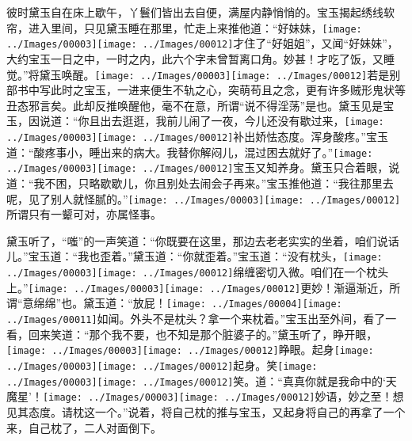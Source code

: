 彼时黛玉自在床上歇午，丫鬟们皆出去自便，满屋内静悄悄的。宝玉揭起绣线软帘，进入里间，只见黛玉睡在那里，忙走上来推他道：``好妹妹，{\texttt{[image: ../Images/00003]}\texttt{[image: ../Images/00012]}\footnotesize \kaishu 才住了``好姐姐''，又闻``好妹妹''，大约宝玉一日之中，一时之内，此六个字未曾暂离口角。妙甚！}才吃了饭，又睡觉。''将黛玉唤醒。{\texttt{[image: ../Images/00003]}\texttt{[image: ../Images/00012]}\footnotesize \kaishu 若是别部书中写此时之宝玉，一进来便生不轨之心，突萌苟且之念，更有许多贼形鬼状等丑态邪言矣。此却反推唤醒他，毫不在意，所谓``说不得淫荡''是也。}黛玉见是宝玉，因说道：``你且出去逛逛，我前儿闹了一夜，今儿还没有歇过来，{\texttt{[image: ../Images/00003]}\texttt{[image: ../Images/00012]}\footnotesize \kaishu 补出娇怯态度。}浑身酸疼。''宝玉道：``酸疼事小，睡出来的病大。我替你解闷儿，混过困去就好了。''{\texttt{[image: ../Images/00003]}\texttt{[image: ../Images/00012]}\footnotesize \kaishu 宝玉又知养身。}黛玉只合着眼，说道：``我不困，只略歇歇儿，你且别处去闹会子再来。''宝玉推他道：``我往那里去呢，见了别人就怪腻的。''{\texttt{[image: ../Images/00003]}\texttt{[image: ../Images/00012]}\footnotesize \kaishu 所谓只有一颦可对，亦属怪事。}

黛玉听了，``嗤''的一声笑道：``你既要在这里，那边去老老实实的坐着，咱们说话儿。''宝玉道：``我也歪着。''黛玉道：``你就歪着。''宝玉道：``没有枕头，{\texttt{[image: ../Images/00003]}\texttt{[image: ../Images/00012]}\footnotesize \kaishu 绵缠密切入微。}咱们在一个枕头上。''{\texttt{[image: ../Images/00003]}\texttt{[image: ../Images/00012]}\footnotesize \kaishu 更妙！渐逼渐近，所谓``意绵绵''也。}黛玉道：``放屁！{\texttt{[image: ../Images/00004]}\texttt{[image: ../Images/00011]}\footnotesize \kaishu 如闻。}外头不是枕头？拿一个来枕着。''宝玉出至外间，看了一看，回来笑道：``那个我不要，也不知是那个脏婆子的。''黛玉听了，睁开眼，{\texttt{[image: ../Images/00003]}\texttt{[image: ../Images/00012]}\footnotesize \kaishu 睁眼。}起身{\texttt{[image: ../Images/00003]}\texttt{[image: ../Images/00012]}\footnotesize \kaishu 起身。}笑{\texttt{[image: ../Images/00003]}\texttt{[image: ../Images/00012]}\footnotesize \kaishu 笑。}道：``真真你就是我命中的`天魔星'！{\texttt{[image: ../Images/00003]}\texttt{[image: ../Images/00012]}\footnotesize \kaishu 妙语，妙之至！想见其态度。}请枕这一个。''说着，将自己枕的推与宝玉，又起身将自己的再拿了一个来，自己枕了，二人对面倒下。

